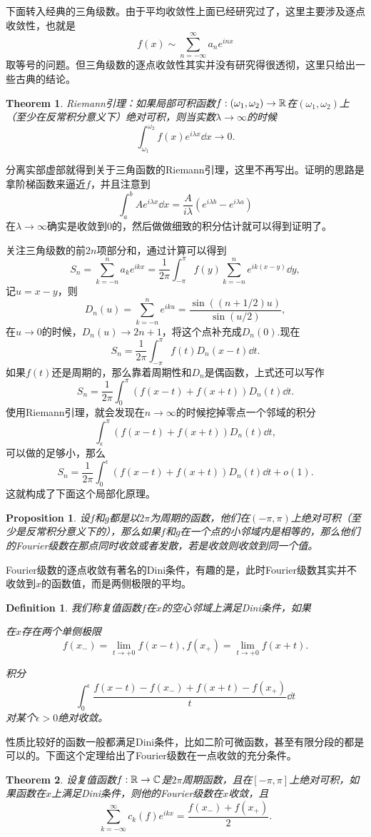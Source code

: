 \documentclass[10pt]{book}
\theoremstyle{plain}%
\newtheorem{pro}{Proposition}[chapter]%
\newtheorem{defi}{Definition}[chapter]%
\newtheorem{theo}{Theorem}[chapter]%
\newcommand{\cc}{\mathbb{C}}
\begin{document}
下面转入经典的三角级数。由于平均收敛性上面已经研究过了，这里主要涉及逐点收敛性，也就是
\[
	f(x)\sim\sum_{n=-\infty}^\infty a_n e^{inx}
\]
取等号的问题。但三角级数的逐点收敛性其实并没有研究得很透彻，这里只给出一些古典的结论。

\begin{theo}
Riemann引理：如果局部可积函数$f:(\omega_1,\omega_2)\to \mathbb{R}$在$(\omega_1,\omega_2)$上（至少在反常积分意义下）绝对可积，则当实数$\lambda \to \infty$的时候
	\[
		\int_{\omega_1}^{\omega_2}f(x)e^{i\lambda x}\dd x \to 0.
	\]
\end{theo}
分离实部虚部就得到关于三角函数的Riemann引理，这里不再写出。证明的思路是拿阶梯函数来逼近$f$，并且注意到
	\[
		\int_a^bAe^{i\lambda x}\dd x=\frac{A}{i\lambda}(e^{i\lambda b}-e^{i\lambda a})
	\]
在$\lambda \to \infty$确实是收敛到0的，然后做做细致的积分估计就可以得到证明了。

关注三角级数的前$2n$项部分和，通过计算可以得到
\[
	S_n=\sum_{k=-n}^n a_k e^{ikx}=\frac{1}{2\pi}\int_{-\pi}^{\pi}f(y)\sum_{k=-n}^n e^{ik(x-y)}\dd y,
\]
记$u=x-y$，则
\[
	D_n(u)=\sum_{k=-n}^n e^{iku}=\frac{\sin ((n+1/2)u)}{\sin(u/2)},
\]
在$u\to 0$的时候，$D_n(u)\to 2n+1$，将这个点补充成$D_n(0)$.现在
\[
	S_n=\frac{1}{2\pi}\int_{-\pi}^{\pi}f(t)D_n(x-t)\dd t.
\]
如果$f(t)$还是周期的，那么靠着周期性和$D_n$是偶函数，上式还可以写作
\[
	S_n=\frac{1}{2\pi}\int^{\pi}_{0}(f(x-t)+f(x+t))D_n(t)\dd t.
\]
使用Riemann引理，就会发现在$n\to \infty$的时候挖掉零点一个邻域的积分
\[
	\int^{\pi}_{\epsilon}(f(x-t)+f(x+t))D_n(t)\dd t,
\]
可以做的足够小，那么
\[
	S_n=\frac{1}{2\pi}\int^{\epsilon}_{0}(f(x-t)+f(x+t))D_n(t)\dd t+o(1).
\]
这就构成了下面这个局部化原理。
\begin{pro}
设$f$和$g$都是以$2\pi$为周期的函数，他们在$(-\pi,\pi)$上绝对可积（至少是反常积分意义下的），那么如果$f$和$g$在一个点的小邻域内是相等的，那么他们的Fourier级数在那点同时收敛或者发散，若是收敛则收敛到同一个值。
\end{pro}
Fourier级数的逐点收敛有著名的Dini条件，有趣的是，此时Fourier级数其实并不收敛到$x$的函数值，而是两侧极限的平均。
\begin{defi}
我们称复值函数$f$在$x$的空心邻域上满足Dini条件，如果

在$x$存在两个单侧极限
\[
	f(x_-)=\lim_{t\to+0}f(x-t),f(x_+)=\lim_{t\to+0}f(x+t).
\]

积分
\[
\int_0^\epsilon\frac{f(x-t)-f(x_-)+f(x+t)-f(x_+)}{t}\dd t
\]
对某个$\epsilon>0$绝对收敛。
\end{defi}
性质比较好的函数一般都满足Dini条件，比如二阶可微函数，甚至有限分段的都是可以的。下面这个定理给出了Fourier级数在一点收敛的充分条件。
\begin{theo}
设复值函数$f:\rr\to\cc$是$2\pi$周期函数，且在$[-\pi,\pi]$上绝对可积，如果函数在$x$上满足Dini条件，则他的Fourier级数在$x$收敛，且
\[
	\sum_{k=-\infty}^\infty c_k(f)e^{ikx}=\frac{f(x_-)+f(x_+)}{2}.
\]
\end{theo}
\end{document}
